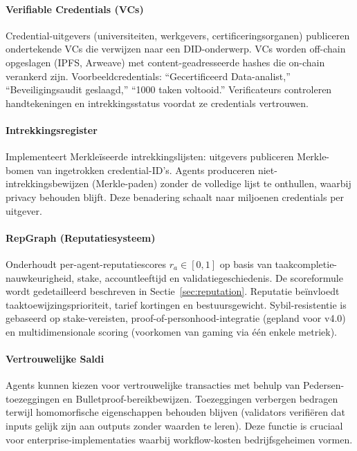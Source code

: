 \documentclass[11pt]{article}
\begin{document}
\paragraph{Verifiable Credentials (VCs)} Credential-uitgevers (universiteiten, werkgevers, certificeringsorganen) publiceren ondertekende VCs die verwijzen naar een DID-onderwerp. VCs worden off-chain opgeslagen (IPFS, Arweave) met content-geadresseerde hashes die on-chain verankerd zijn. Voorbeeldcredentials: ``Gecertificeerd Data-analist,'' ``Beveiligingsaudit geslaagd,'' ``1000 taken voltooid.'' Verificateurs controleren handtekeningen en intrekkingsstatus voordat ze credentials vertrouwen.

\paragraph{Intrekkingsregister} Implementeert Merkleïseerde intrekkingslijsten: uitgevers publiceren Merkle-bomen van ingetrokken credential-ID's. Agents produceren niet-intrekkingsbewijzen (Merkle-paden) zonder de volledige lijst te onthullen, waarbij privacy behouden blijft. Deze benadering schaalt naar miljoenen credentials per uitgever.

\paragraph{RepGraph (Reputatiesysteem)} Onderhoudt per-agent-reputatiescores $r_a \in [0,1]$ op basis van taakcompletie-nauwkeurigheid, stake, accountleeftijd en validatiegeschiedenis. De scoreformule wordt gedetailleerd beschreven in Sectie~\ref{sec:reputation}. Reputatie beïnvloedt taaktoewijzingsprioriteit, tarief kortingen en bestuursgewicht. Sybil-resistentie is gebaseerd op stake-vereisten, proof-of-personhood-integratie (gepland voor v4.0) en multidimensionale scoring (voorkomen van gaming via één enkele metriek).

\paragraph{Vertrouwelijke Saldi} Agents kunnen kiezen voor vertrouwelijke transacties met behulp van Pedersen-toezeggingen en Bulletproof-bereikbewijzen. Toezeggingen verbergen bedragen terwijl homomorfische eigenschappen behouden blijven (validators verifiëren dat inputs gelijk zijn aan outputs zonder waarden te leren). Deze functie is cruciaal voor enterprise-implementaties waarbij workflow-kosten bedrijfsgeheimen vormen.
\end{document}
